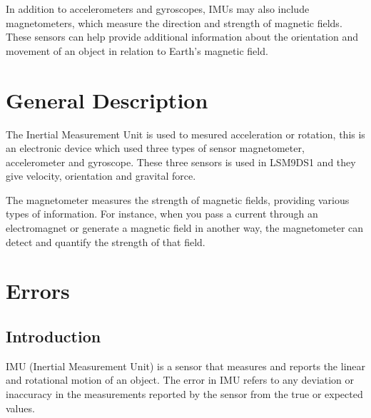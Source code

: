 In addition to accelerometers and gyroscopes, IMUs may also include magnetometers, which measure the direction and strength of magnetic fields. These sensors can help provide additional information about the orientation and movement of an object in relation to Earth's magnetic field.\cite{Wang:2022}



\section{General Description }

The Inertial Measurement Unit is used to mesured acceleration or rotation, this is an electronic device which used three types of sensor magnetometer, accelerometer and gyroscope. These three sensors is used in LSM9DS1 and they give velocity, orientation and gravital force. 

The magnetometer measures the strength of magnetic fields, providing various types of information. For instance, when you pass a current through an electromagnet or generate a magnetic field in another way, the magnetometer can detect and quantify the strength of that field. \cite{st_microelectronics:2024}
\cite{STMicroelectronics_LSM9DS1:2024}\cite{sabatini:2011}









\section{Errors}  \label{Chap: Errors}

\subsection{Introduction}

IMU (Inertial Measurement Unit) is a sensor that measures and reports the linear and rotational motion of an object. The error in IMU refers to any deviation or inaccuracy in the measurements reported by the sensor from the true or expected values.

\bigskip


